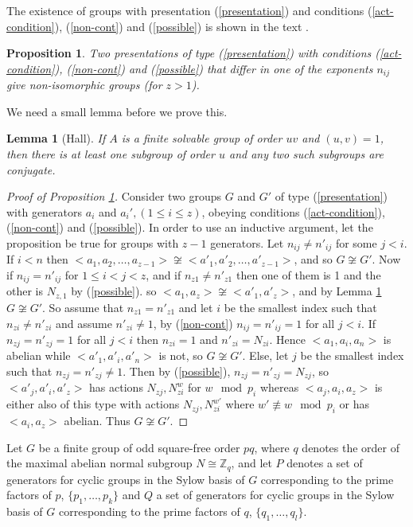 \documentclass[11pt]{book}
\newtheorem{Lem}[theorem]{Lemma}
\newtheorem{Prop}[theorem]{Proposition}
\theoremstyle{Rem}
\theoremstyle{definition}
\numberwithin{equation}{section}
\newcommand\ZZ{\mathbb Z}
\begin{document}
The existence of groups with presentation (\ref{presentation}) and conditions (\ref{act-condition}), (\ref{non-cont}) and (\ref{possible}) is shown in the text \cite{MR896269}. \begin{Prop}\label{uniqueness}
Two presentations of type (\ref{presentation})  with conditions (\ref{act-condition}), (\ref{non-cont}) and (\ref{possible}) that differ in one of the exponents $n_{ij}$ give non-isomorphic groups (for $z>1$).
\end{Prop}
We need a small lemma before we prove this.
\begin{Lem}[Hall]\label{hall}
If $A$ is a finite solvable group of order $uv$ and $(u,v) = 1$, then there is at least one subgroup of order $u$ and any two such subgroups are conjugate.
\end{Lem}
\begin{proof}[Proof of Proposition \ref{uniqueness}]
Consider two groups $G$ and $G'$ of type (\ref{presentation}) with generators $a_i$ and $a_i', (1\leq i \leq z)$, obeying conditions (\ref{act-condition}), (\ref{non-cont}) and (\ref{possible}). 
In order to use an inductive argument, let the proposition be true for groups with $z-1$ generators. Let $n_{ij}\neq n'_{ij}$ for some $j< i$. 
If $i< n$ then $<a_1,a_2,\dots, a_{z-1}> \not\cong <a'_1,a'_2,\dots, a'_{z-1}>$, and so $G\not\cong G'$. Now if $n_{ij} = n'_{ij}$ for $1\leq i<j<z$, and if $n_{z1}\neq n'_{z1}$ then one of them is 1 and the other is $N_{z,1}$ by (\ref{possible}). so $<a_1, a_z> \not \cong <a'_1, a'_z>$, and by Lemma \ref{hall} $G\not\cong G'$. So assume that $n_{z1} = n'_{z1}$ and let $i$ be the smallest index such that $n_{z i}\neq n'_{zi}$ and assume $n'_{z i}\neq 1$, by (\ref{non-cont}) $n_{ij} = n'_{ij}=1$ for all $j<i$. If $n_{z j} = n'_{zj} = 1$ for all $j<i$ then $n_{zi} = 1$ and $n'_{zi} = N_{zi}$. Hence $<a_1, a_i, a_n>$ is abelian while $<a'_1, a'_i, a'_n>$ is not, so $G\not\cong G'$. Else, let $j$ be the smallest index such that $n_{zj} = n'_{zj} \neq 1$. Then by (\ref{possible}), $n_{zj} = n'_{zj} = N_{zj}$, so $<a'_j, a'_i, a'_z>$ has actions $N_{zj}, N_{zi}^w$ for $w \mod p_i$ whereas $<a_j, a_i, a_z>$ is either also of this type with actions $N_{zj}, N_{zi}^{w\prime}$ where $w'\not\equiv w \mod p_i$ or has $<a_i, a_z>$ abelian. Thus $G\not\cong G'$. 
\end{proof}
Let $G$ be a finite group of odd square-free order $pq$, where $q$ denotes the order of the maximal abelian normal subgroup $N \cong \ZZ_q$, and let $P$ denotes a set of generators for cyclic groups in the Sylow basis of $G$ corresponding to the prime factors of $p$, $\{p_1,\dots, p_k\}$ and $Q$ a set of generators for cyclic groups in the Sylow basis of $G$ corresponding to the prime factors of $q$, $\{q_1,\dots, q_l\}$. 
\end{document}

